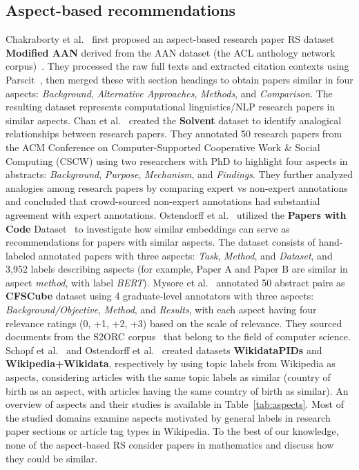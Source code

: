\documentclass[sigconf,anonymous]{acmart}
\begin{document}
\subsection{Aspect-based recommendations}
Chakraborty et al.~\cite{chakraborty2016ferosa} first proposed an aspect-based research paper RS dataset \textbf{Modified AAN} derived from the AAN dataset (the ACL anthology network corpus)~\cite{radev2009acl}.
They processed the raw full texts and extracted citation contexts using Parscit~\cite{councill2008parscit}, then merged these with section headings to obtain papers similar in four aspects: \textit{Background}, \textit{Alternative Approaches}, \textit{Methods}, and \textit{Comparison}.
The resulting dataset represents computational linguistics/NLP research papers in similar aspects.
Chan et al.~\cite{chan2018solventCSCW} created the \textbf{Solvent} dataset to identify analogical relationships between research papers.
They annotated 50 research papers from the ACM Conference on Computer-Supported Cooperative Work \& Social Computing (CSCW) using two researchers with PhD to highlight four aspects in abstracts: \textit{Background}, \textit{Purpose}, \textit{Mechanism}, and \textit{Findings}.
They further analyzed analogies among research papers by comparing expert vs non-expert annotations and concluded that crowd-sourced non-expert annotations had substantial agreement with expert annotations.
Ostendorff et al.~\cite{Ostendorff2022a} utilized the \textbf{Papers with Code} Dataset~\cite{2020PapWitCodeData} to investigate how similar embeddings can serve as recommendations for papers with similar aspects.
The dataset consists of hand-labeled annotated papers with three aspects: \textit{Task}, \textit{Method}, and \textit{Dataset}, and 3,952 labels describing aspects (for example, Paper A and Paper B are similar in aspect \textit{method}, with label \textit{BERT}).
Mysore et al.~\cite{mysore2021csfcube} annotated 50 abstract pairs as \textbf{CFSCube} dataset using 4 graduate-level annotators with three aspects: \textit{Background/Objective}, \textit{Method}, and \textit{Results}, with each aspect having four relevance ratings (0, +1, +2, +3) based on the scale of relevance.
They sourced documents from the S2ORC corpus~\cite{lo-etal-2020-s2orc} that belong to the field of computer science.
Schopf et al.~\cite{2023aspectcse} and Ostendorff et al.~\cite{2020OstendorffWiki} created datasets \textbf{WikidataPIDs} and \textbf{Wikipedia+Wikidata}, respectively by using topic labels from Wikipedia as aspects, considering articles with the same topic labels as similar (country of birth as an aspect, with articles having the same country of birth as similar).
An overview of aspects and their studies is available in Table~\ref{tab:aspects}.
Most of the studied domains examine aspects motivated by general labels in research paper sections or article tag types in Wikipedia.
To the best of our knowledge, none of the aspect-based RS consider papers in mathematics and discuss how they could be similar.
\end{document}
